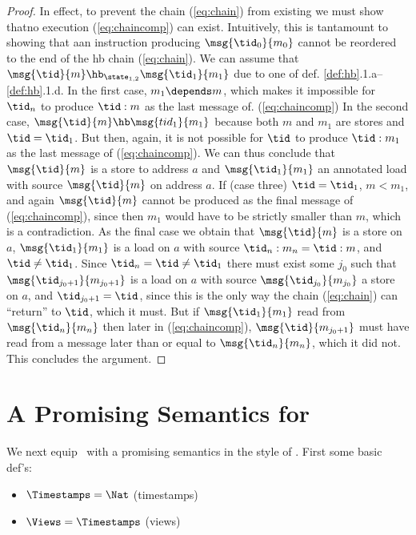 \begin{proof}
In effect, to prevent the chain (\ref{eq:chain}) from existing we must show thatno execution (\ref{eq:chaincomp}) can exist. Intuitively, this is tantamount to showing that aan instruction producing $\msg{\tid_0}{m_0}$ cannot be reordered to the end of the hb chain (\ref{eq:chain}). We can assume that $\msg{\tid}{m}\hb_{\state_{1,2}}\msg{\tid_1}{m_1}$ due to one of def. \ref{def:hb}.1.a--\ref{def:hb}.1.d. In the first case, $m_1\depends m$, which makes it impossible for
$\tid_n$ to produce $\tid:m$ as the last message of. (\ref{eq:chaincomp})
In the second case, $\msg{\tid}{m}\hb\msg{tid_1}{m_1}$ because both $m$ and
$m_1$ are stores and $\tid=\tid_1$. But then, again, it is not possible for
$\tid$ to produce $\tid:m_1$ as the last message of (\ref{eq:chaincomp}).
We can thus conclude that $\msg{\tid}{m}$ is a store to address $a$
and $\msg{\tid_1}{m_1}$ an annotated load with source $\msg{\tid}{m}$ on address $a$. If (case three) $\tid=\tid_1$, $m<m_1$, and again $\msg{\tid}{m}$ cannot be produced as the final message of (\ref{eq:chaincomp}), since then $m_1$ would have to be strictly smaller than $m$, which is a contradiction.
As the final case we obtain that $\msg{\tid}{m}$ is a store on $a$, $\msg{\tid_1}{m_1}$ is a load on $a$ with source $\tid_n:m_n=\tid:m$, and $\tid\neq\tid_1$. Since $\tid_n=\tid \neq \tid_1$ there must exist some $j_0$ such that $\msg{\tid_{j_0+1}}{m_{j_0+1}}$ is a load on $a$ with source $\msg{\tid_{j_0}}{m_{j_0}}$ a store on $a$, and $\tid_{j_0+1}=\tid$, since this is the only way the chain (\ref{eq:chain}) can ``return'' to $\tid$, which it must. But if $\msg{\tid_1}{m_1}$ read from $\msg{\tid_n}{m_n}$ then later in (\ref{eq:chaincomp}), $\msg{\tid}{m_{j_0+1}}$ must have read from a message later than or equal to $\msg{\tid_n}{m_n}$, which it did not. This concludes the argument.
\end{proof}
%
\section{A Promising Semantics for \MCMIL}

We next equip \MCMIL\ with a promising semantics in the style of
\cite{PulteEtAlPromising19}. First some basic def's:
\begin{itemize}
\item $\Timestamps = \Nat$ (timestamps)
\item $\Views = \Timestamps$ (views)
\end{itemize}


